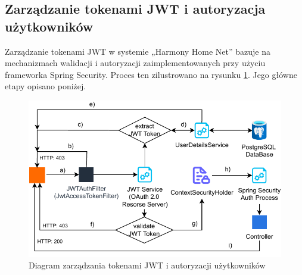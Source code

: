 \subsection{Zarządzanie tokenami JWT i autoryzacja użytkowników}

Zarządzanie tokenami JWT w systemie „Harmony Home Net” bazuje na mechanizmach walidacji i autoryzacji zaimplementowanych przy użyciu frameworka Spring Security. Proces ten zilustrowano na rysunku \ref{fig:resource_access_flow}. Jego główne etapy opisano poniżej.
\begin{figure}[ht]
    \centering
    \includegraphics[scale=1]{rys03/Diagram_dotępu_do_zasobów_systemu} 
    \caption{Diagram zarządzania tokenami JWT i autoryzacji użytkowników~\cite{JWToauth}}
    \label{fig:resource_access_flow}
\end{figure}

